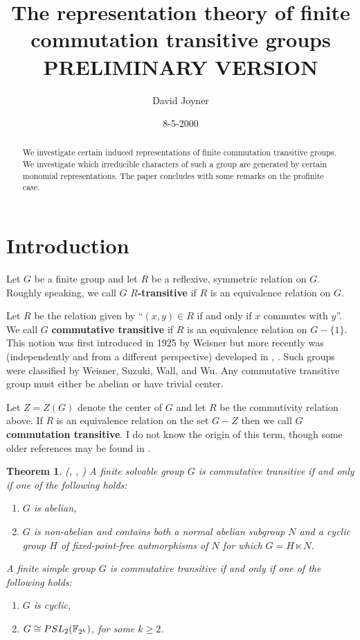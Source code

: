 \documentclass[amsfonts,12pt]{article}
\newtheorem{theorem}{Theorem}
\begin{document}
\author{David Joyner}
\title{The representation theory of finite commutation 
transitive groups\\
PRELIMINARY VERSION}
\date{8-5-2000}
\maketitle

\begin{abstract}
We investigate certain induced representations of finite 
commutation transitive groups.
We investigate which irreducible characters of such a group
are generated by certain monomial representations.
The paper concludes with some remarks on the
profinite case.
\end{abstract}

\section{Introduction}

Let $G$ be a finite group and let $R$ be a reflexive,
symmetric relation on $G$. Roughly speaking,
we call $G$ {\bf $R$-transitive}
if $R$ is an equivalence relation on $G$. 

Let $R$ be the relation
given by ``$(x,y) \in R$ if and only if $x$ commutes with $y$''.
We call $G$ {\bf commutative transitive}
if $R$ is an equivalence relation on $G-\{1\}$. This notion
was first introduced in 1925 by Weisner \cite{W} but more recently
was (independently and from a different perspective) 
developed in \cite{FGRS}, \cite{Wu}. Such groups were classified by 
Weisner, Suzuki, Wall, and Wu. Any commutative transitive group
must either be abelian or have trivial center.

Let $Z=Z(G)$ denote the center of $G$ and let $R$ be the
commutivity relation above. If $R$ is an equivalence relation on 
the set $G-Z$ then
we call $G$ {\bf commutation transitive}. I do not know
the origin of this term, though some older references
may be found in \cite{LR}.

\begin{theorem} (\cite{S}, \cite{W}, \cite{Wu}) 
A finite solvable group $G$ is 
commutative transitive if and only if one of the following holds:
\begin{enumerate}
\item
$G$ is abelian,

\item
$G$ is non-abelian and contains both a normal
abelian subgroup $N$ and a cyclic group $H$ of
fixed-point-free autmorphisms of $N$ for which 
$G=H\ltimes N$.

\end{enumerate}

A finite simple group $G$ is 
commutative transitive if and only if one of the following holds:
\begin{enumerate}
\item
$G$ is cyclic,

\item
$G\cong PSL_2({\Bbb{F}}_{2^k})$, for some $k\geq 2$.
\end{enumerate}
\end{theorem}
\end{document}
